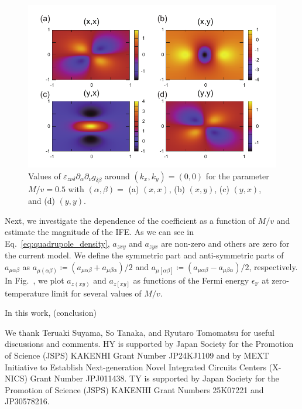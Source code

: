\documentclass[aps,prb,longbibliography,superscriptaddress,twocolumn]{revtex4-2}
\begin{document}
\begin{figure}[t]
    \begin{center}
        \includegraphics[width=\columnwidth]{fig_IFE/asym_density.pdf}
    \end{center}
    \caption{Values of $\varepsilon_{z\nu\delta}\partial_{\alpha}\partial_{\nu}g_{\delta\beta}$ around $(k_x,k_y)=(0,0)$ for the parameter $M/v=0.5$ with $(\alpha,\beta)=$ (a) $(x,x)$, (b) $(x,y)$, (c) $(y,x)$, and (d) $(y,y)$.}
    \label{fig:asym_density}
\end{figure}

Next, we investigate the dependence of the coefficient as a function of $M/v$ and estimate the magnitude of the IFE. As we can see in Eq.~\eqref{eq:quadrupole_density}, $a_{zxy}$ and $a_{zyx}$ are non-zero and others are zero for the current model. We define the symmetric part and anti-symmetric parts of $a_{\mu\alpha\beta}$ as $a_{\mu(\alpha\beta)}\coloneqq (a_{\mu\alpha\beta}+a_{\mu\beta\alpha})/2$ and $a_{\mu[\alpha\beta]}\coloneqq (a_{\mu\alpha\beta}-a_{\mu\beta\alpha})/2$, respectively. In Fig.~, we plot $a_{z(xy)}$ and $a_{z[xy]}$ as functions of the Fermi energy $\epsilon_\mathrm{F}$ at zero-temperature limit for several values of $M/v$. 


In this work, (conclusion)

We thank Teruaki Suyama, So Tanaka, and Ryutaro Tomomatsu for useful discussions and comments. HY is supported by Japan Society for the Promotion of Science (JSPS) KAKENHI Grant Number JP24KJ1109 and by MEXT Initiative to Establish Next-generation Novel Integrated Circuits Centers (X-NICS) Grant Number JPJ011438. TY is supported by Japan Society for the Promotion of Science (JSPS) KAKENHI Grant Numbers 25K07221 and JP30578216.


\end{document}

